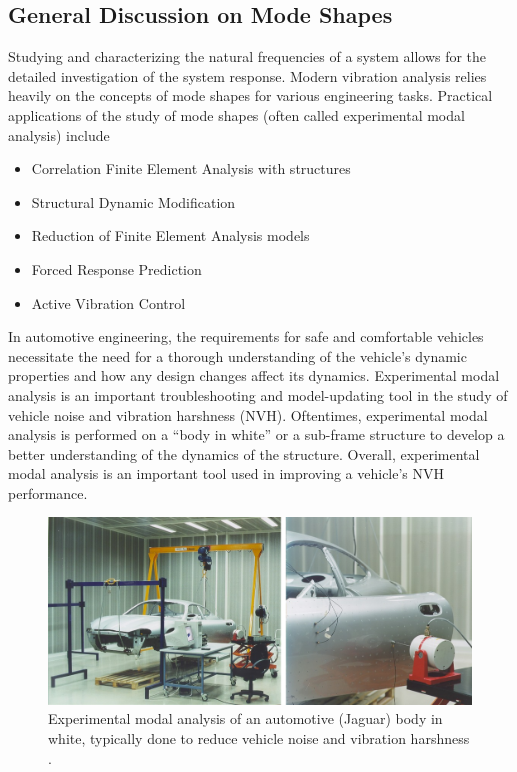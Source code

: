 \documentclass[12pt,letter]{article}
\begin{document}
	\subsection{General Discussion on Mode Shapes}
	
	Studying and characterizing the natural frequencies of a system allows for the detailed investigation of the system response. Modern vibration analysis relies heavily on the concepts of mode shapes for various engineering tasks. Practical applications of the study of mode shapes (often called experimental modal analysis) include
	\begin{itemize}
		\item Correlation Finite Element Analysis with structures
		\item Structural Dynamic Modification
		\item Reduction of Finite Element Analysis models
		\item Forced Response Prediction			
		\item Active Vibration Control	
	\end{itemize}
	
	\begin{vibration_case_study}
		In automotive engineering, the requirements for safe and comfortable vehicles necessitate the need for a thorough understanding of the vehicle's dynamic properties and how any design changes affect its dynamics. Experimental modal analysis is an important troubleshooting and model-updating tool in the study of vehicle noise and vibration harshness (NVH). Oftentimes, experimental modal analysis is performed on a ``body in white'' or a sub-frame structure to develop a better understanding of the dynamics of the structure. Overall, experimental modal analysis is an important tool used in improving a vehicle's NVH performance.
		\begin{figure}[H]
			\centering
			\includegraphics[width=6in]{../figures/modal_testing}
			\caption{Experimental modal analysis of an automotive (Jaguar) body in white, typically done to reduce vehicle noise and vibration harshness \protect\footnotemark[1].}
		\end{figure}
	\end{vibration_case_study}
	
\end{document}
